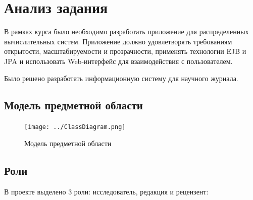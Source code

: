 \section{Анализ задания}
В рамках курса было необходимо разработать приложение для распределенных вычислительных систем. Приложение должно удовлетворять требованиям открытости, масштабируемости и прозрачности, применять технологии EJB и JPA и использовать Web-интерфейс для взаимодействия с пользователем.

Было решено разработать информационную систему для научного журнала.

\subsection{Модель предметной области}

\begin{figure}[H]
\centering
\texttt{[image: ../ClassDiagram.png]}
\caption{Модель предметной области}
\end{figure}

\subsection{Роли}

В проекте выделено 3 роли: исследователь, редакция и рецензент:

